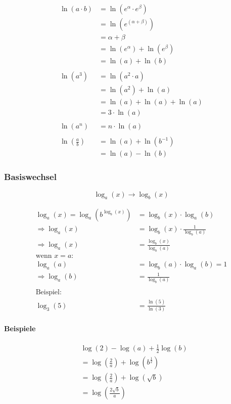 \begin{align*}
    \ln(a \cdot b) &= \ln(e^{\alpha} \cdot e^{\beta}) \\
    &= \ln(e^{(\alpha + \beta)}) \\
    &= \alpha + \beta \\
    &= \ln(e^{\alpha}) + \ln(e^{\beta}) \\
    &= \ln(a) + \ln (b) \\
    \\
    \ln(a^3) &= \ln(a^2 \cdot a) \\
    &= \ln(a^2) + \ln(a) \\
    &= \ln(a) + \ln(a) + \ln(a) \\
    &= 3 \cdot \ln(a) \\
    \\
    \ln(a^n) &= n \cdot \ln(a) \\
    \\
    \ln(\frac{a}{b}) &= \ln(a) + \ln(b^{-1}) \\
    &= \ln(a) - \ln(b)
\end{align*}

\subsubsection{Basiswechsel}
\[
    \log_a(x) \rightarrow \log_b(x)    
\]

\begin{align*}
    \log_a(x) = \log_a\left(b^{\log_b(x)}\right)
    &= \log_b(x) \cdot \log_a(b) \\
    \Rightarrow \log_a(x) &= \log_b(x) \cdot \frac{1}{\log_b(a)} \\
    \Rightarrow \log_a(x) &= \frac{\log_b(x)}{\log_b(a)} \\
    \text{wenn \(x = a\):} \\
    \log_a(a) &= \log_b(a) \cdot \log_a(b) = 1 \\
    \Rightarrow \log_a(b) &= \frac{1}{\log_b(a)} \\
    \\
    \text{Beispiel:} \\
    \log_3(5) &= \frac{\ln(5)}{\ln(3)}
\end{align*}

\paragraph{Beispiele}

\begin{align*}
    & \log(2) - \log(a) + \frac{1}{2} \log(b) \\
    &= \log\left(\frac{2}{a}\right) + \log\left(b^{\frac{1}{2}}\right) \\
    &= \log\left(\frac{2}{a}\right) + \log\left(\sqrt{b}\right) \\
    &= \log\left(\frac{2 \sqrt{b}}{a}\right)
\end{align*}

